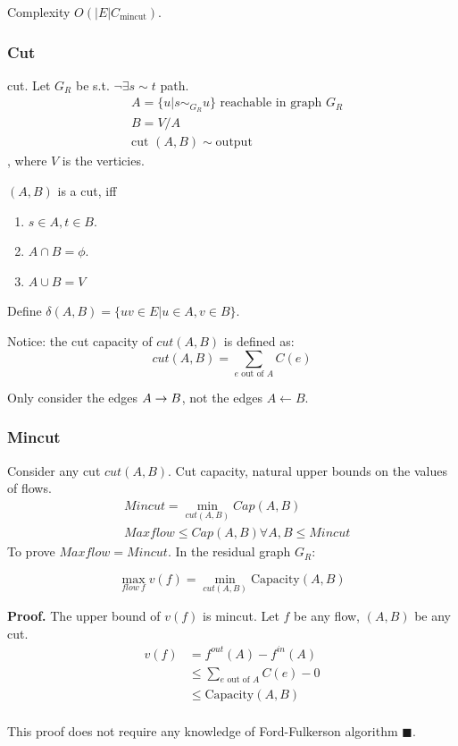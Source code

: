 \documentclass[a4paper]{report}
\theoremstyle{definition}
\begin{document}
Complexity $O(|E| C_{\text{mincut}})$. 
\subsubsection{Cut}
cut. Let $G_R$ be s.t. $\neg \exists s\sim t$ path. 
\begin{align*}
& A = \{u| s\sim_{G_R} u\} \text{ reachable in graph $G_R$}\\
& B = V/A\\
& \text{cut } (A, B) \sim \text{output}
\end{align*}
, where $V$ is the verticies. 

$(A, B)$ is a cut, iff 
\begin{enumerate}
\item $s\in A, t\in B$. 
\item $A\cap B = \phi$. 
\item $A\cup B = V$
\end{enumerate}
Define $\delta(A,B)=\{uv\in E| u\in A, v\in B\}$. 

Notice: the cut capacity of $cut(A,B)$ is defined as:
$$
cut(A, B) = \sum_{e \text{ out of }A}C(e)
$$

Only consider the edges $A\rightarrow B$, not the edges $A \leftarrow B$. 

\subsubsection{Mincut}
Consider any cut $cut(A,B)$. Cut capacity, natural upper bounds on the values of flows.
\begin{align*}
& Mincut = \min_{cut(A,B)} Cap(A, B)\\
& Maxflow \leq Cap(A, B) \forall A, B \leq Mincut
\end{align*}
To prove $Maxflow = Mincut$. In the residual graph $G_R$:

$$
\max_{flow~f} v(f) = \min_{cut(A, B)} \text{Capacity}(A,B)
$$

\textbf{Proof.} The upper bound of $v(f)$ is mincut. Let $f$ be any flow, $(A,B)$ be any cut. 
\begin{align*}
v(f) &= f^{out}(A)-f^{in}(A) \\
&\leq \sum_{e \text{ out of }A}C(e) - 0\\
&\leq \text{Capacity}(A, B) \\
\end{align*}

This proof does not require any knowledge of Ford-Fulkerson algorithm $\blacksquare$. 
\end{document}
